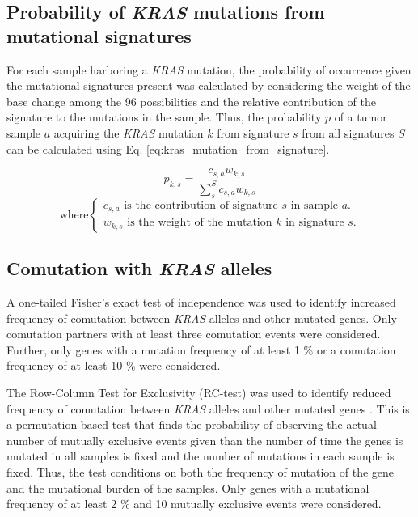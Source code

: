 \documentclass[english, 12pt, letterpaper]{article}
\newcommand{\KRAS}{\emph{KRAS}}
\begin{document}
\subsection*{Probability of \KRAS{} mutations from mutational signatures}

For each sample harboring a \KRAS{} mutation, the probability of occurrence given the mutational signatures present was calculated by considering the weight of the base change among the 96 possibilities and the relative contribution of the signature to the mutations in the sample. 
Thus, the probability $p$ of a tumor sample $a$ acquiring the \KRAS{} mutation $k$ from signature $s$ from all signatures $S$ can be calculated using Eq. \ref{eq:kras_mutation_from_signature}.

\begin{equation}
\label{eq:kras_mutation_from_signature}
p_{k,s} = \frac{c_{s,a} w_{k,s}}{\sum_{s}^{S} c_{s,a} w_{k,s}}
\end{equation}
\begin{equation*}
    \text{where} 
    \begin{cases}
        c_{s,a} \text{ is the contribution of signature $s$ in sample $a$.} \\
        w_{k,s} \text{ is the weight of the mutation $k$ in signature $s$.}
    \end{cases}
\end{equation*}


\subsection*{Comutation with \KRAS{} alleles}

A one-tailed Fisher’s exact test of independence was used to identify increased frequency of comutation between \KRAS{} alleles and other mutated genes. Only comutation partners with at least three comutation events were considered. Further, only genes with a mutation frequency of at least 1 \% or a comutation frequency of at least 10 \% were considered. 

The Row-Column Test for Exclusivity (RC-test) was used to identify reduced frequency of comutation between \KRAS{} alleles and other mutated genes \cite{Leiserson2016}. 
This is a permutation-based test that finds the probability of observing the actual number of mutually exclusive events given than the number of time the genes is mutated in all samples is fixed and the number of mutations in each sample is fixed.
Thus, the test conditions on both the frequency of mutation of the gene and the mutational burden of the samples.
Only genes with a mutational frequency of at least 2 \% and 10 mutually exclusive events were considered.
\end{document}
